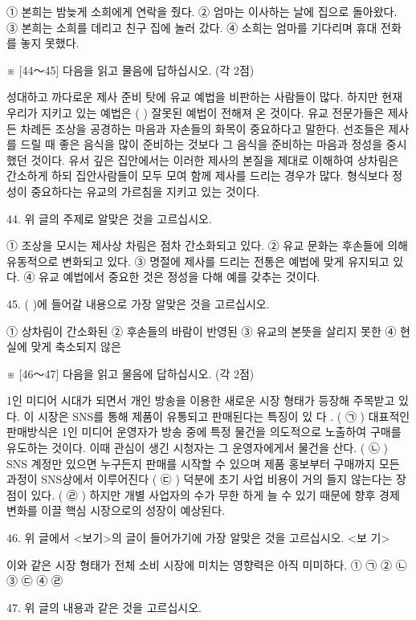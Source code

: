 \documentclass[12pt]{article}
\begin{document}
\begin{enumerate}[1.]
① 본희는 밤늦게 소희에게 연락을 줬다.
② 엄마는 이사하는 날에 집으로 돌아왔다.
③ 본희는 소희를 데리고 친구 집에 놀러 갔다.
④ 소희는 엄마를 기다리며 휴대 전화를 놓지 못했다.




※ [44～45] 다음을 읽고 물음에 답하십시오. (각 2점)

  성대하고 까다로운 제사 준비 탓에 유교 예법을 비판하는 사람들이
많다. 하지만 현재 우리가 지키고 있는 예법은 (      ) 잘못된
예법이 전해져 온 것이다. 유교 전문가들은 제사든 차례든 조상을 공경하는
마음과 자손들의 화목이 중요하다고 말한다. 선조들은 제사를 드릴 때
좋은 음식을 많이 준비하는 것보다 그 음식을 준비하는 마음과 정성을
중시했던 것이다. 유서 깊은 집안에서는 이러한 제사의 본질을 제대로
이해하여 상차림은 간소하게 하되 집안사람들이 모두 모여 함께 제사를
드리는 경우가 많다. 형식보다 정성이 중요하다는 유교의 가르침을 지키고
있는 것이다.


44. 위 글의 주제로 알맞은 것을 고르십시오.

① 조상을 모시는 제사상 차림은 점차 간소화되고 있다.
② 유교 문화는 후손들에 의해 유동적으로 변화되고 있다.
③ 명절에 제사를 드리는 전통은 예법에 맞게 유지되고 있다.
④ 유교 예법에서 중요한 것은 정성을 다해 예를 갖추는 것이다.


45. (   )에 들어갈 내용으로 가장 알맞은 것을 고르십시오.

① 상차림이 간소화된
② 후손들의 바람이 반영된
③ 유교의 본뜻을 살리지 못한
④ 현실에 맞게 축소되지 않은




※ [46～47] 다음을 읽고 물음에 답하십시오. (각 2점)

  1인 미디어 시대가 되면서 개인 방송을 이용한 새로운 시장 형태가 등장해
주목받고 있다. 이 시장은 SNS를 통해 제품이 유통되고 판매된다는 특징이
있 다 . ( ㉠ ) 대표적인 판매방식은 1인 미디어 운영자가 방송 중에
특정 물건을 의도적으로 노출하여 구매를 유도하는 것이다. 이때 관심이
생긴 시청자는 그 운영자에게서 물건을 산다. ( ㉡ ) SNS 계정만
있으면 누구든지 판매를 시작할 수 있으며 제품 홍보부터 구매까지 모든
과정이 SNS상에서 이루어진다 ( ㉢ ) 덕분에 초기 사업 비용이 거의
들지 않는다는 장점이 있다. ( ㉣ ) 하지만 개별 사업자의 수가 무한
하게 늘 수 있기 때문에 향후 경제 변화를 이끌 핵심 시장으로의 성장이
예상된다.


46.
위 글에서 <보기>의 글이 들어가기에 가장 알맞은 것을 고르십시오.
<보 기>

이와 같은 시장 형태가 전체 소비 시장에 미치는 영향력은 아직 미미하다.
① ㉠	② ㉡	③ ㉢	④ ㉣


47. 위 글의 내용과 같은 것을 고르십시오.


\end{enumerate}
\end{document}
